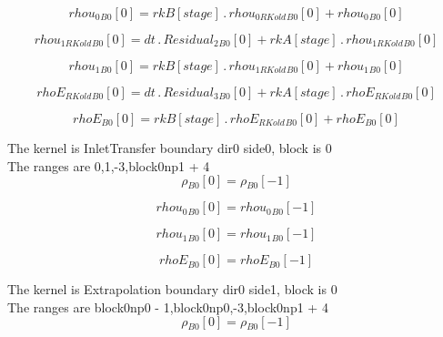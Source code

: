 \documentclass{article}
\begin{document}
\begin{dmath}{rhou_{0}{_{B0}}}[{0}] = {rkB}[{stage}] \,.\, {rhou_{0 RKold}{_{B0}}}[{0}] + {rhou_{0}{_{B0}}}[{0}]\end{dmath}

\begin{dmath}{rhou_{1 RKold}{_{B0}}}[{0}] = dt \,.\, {Residual_{2}{_{B0}}}[{0}] + {rkA}[{stage}] \,.\, {rhou_{1 RKold}{_{B0}}}[{0}]\end{dmath}

\begin{dmath}{rhou_{1}{_{B0}}}[{0}] = {rkB}[{stage}] \,.\, {rhou_{1 RKold}{_{B0}}}[{0}] + {rhou_{1}{_{B0}}}[{0}]\end{dmath}

\begin{dmath}{rhoE_{RKold}{_{B0}}}[{0}] = dt \,.\, {Residual_{3}{_{B0}}}[{0}] + {rkA}[{stage}] \,.\, {rhoE_{RKold}{_{B0}}}[{0}]\end{dmath}

\begin{dmath}{rhoE{_{B0}}}[{0}] = {rkB}[{stage}] \,.\, {rhoE_{RKold}{_{B0}}}[{0}] + {rhoE{_{B0}}}[{0}]\end{dmath}

\noindent The kernel is InletTransfer boundary dir0 side0, block is 0\\\noindent The ranges are 0,1,-3,block0np1 + 4\\\begin{dmath}{\rho{_{B0}}}[{0}] = {\rho{_{B0}}}[{-1}]\end{dmath}

\begin{dmath}{rhou_{0}{_{B0}}}[{0}] = {rhou_{0}{_{B0}}}[{-1}]\end{dmath}

\begin{dmath}{rhou_{1}{_{B0}}}[{0}] = {rhou_{1}{_{B0}}}[{-1}]\end{dmath}

\begin{dmath}{rhoE{_{B0}}}[{0}] = {rhoE{_{B0}}}[{-1}]\end{dmath}

\noindent The kernel is Extrapolation boundary dir0 side1, block is 0\\\noindent The ranges are block0np0 - 1,block0np0,-3,block0np1 + 4\\\begin{dmath}{\rho{_{B0}}}[{0}] = {\rho{_{B0}}}[{-1}]\end{dmath}
\end{document}
